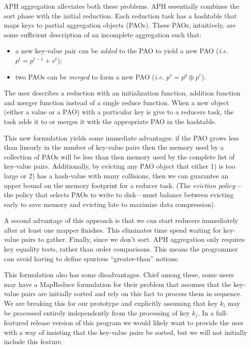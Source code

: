 \documentclass[10pt,letter,final,article,twocolumn]{article} %
\begin{document}
 APH aggregation alleviates both these problems. APH essentially combines the sort phase with the initial reduction. Each reduction task has a hashtable that maps keys to partial aggregation objects (PAOs). These PAOs, intuitively, are some sufficient description of an incomplete aggregation such that:
\begin{itemize}
 \item a new key-value pair can be \emph{added} to the PAO to yield a new PAO (\emph{i.e.} $p^t = p^{t-1} + v^t$);
 \item two PAOs can be \emph{merged} to form a new PAO (\emph{i.e.} $p^s = p^q \oplus p^r$).
\end{itemize}
The user describes a reduction with an initialization function, addition function and merger function instead of a single reduce function. When a new object (either a value or a PAO) with a particular key is give to a reducers task, the task adds it to or merges it with the appropriate PAO in the hashtable.

This new formulation yields some immediate advantages: if the PAO grows less than linearly in the number of key-value pairs then the memory used by a collection of PAOs will be less than then memory used by the complete list of key-value pairs. Additionally, by evicting any PAO object that either 1) is too large or 2) has a hash-value with many collisions, then we can guarantee an upper bound on the memory footprint for a reducer task. (The \emph{eviction policy}---the policy that selects PAOs to write to disk---must balance between evicting early to save memory and evicting late to maximize data compression).  

A second advantage of this approach is that we can start reducers immediately after at least one mapper finishes. This eliminates time spend waiting for key-value pairs to gather. Finally, since we don't sort. APH aggregation only requires key equality tests, rather than order comparisons. This means the programmer can avoid having to define spurious ``greater-than'' notions.

This formulation also has some disadvantages. Chief among these, some users may have a MapReduce formulation for their problem that assumes that the key-value pairs are initially sorted and rely on this fact to process them in sequence. We are breaking this for our prototype and explicitly assuming that key $k_i$ may be processed entirely independently from the processing of key $k_j$. In a full-featured release version of this program we would likely want to provide the user with a way of insisting that the key-value pairs be sorted, but we will not initially include this feature.
\end{document}
